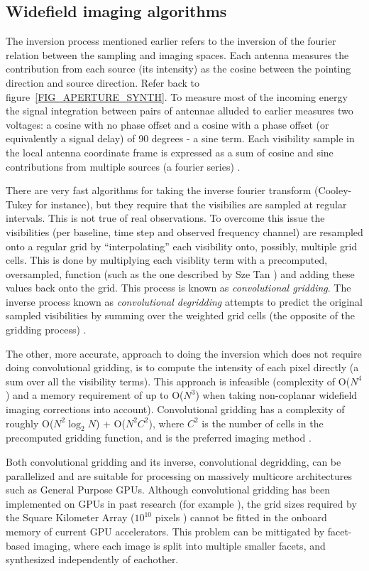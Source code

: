 \documentclass[a4paper, two column]{article}
\begin{document}
\subsection{Widefield imaging algorithms}
The inversion process mentioned earlier refers to the inversion of the fourier relation between the sampling and imaging spaces. Each antenna measures the contribution from each source (its intensity) as the cosine 
between the pointing direction and source direction. Refer back to figure~\ref{FIG_APERTURE_SYNTH}. To measure most of the incoming energy the signal integration between pairs of antennae alluded to earlier measures two voltages: a cosine 
with no phase offset and a cosine with a phase offset (or equivalently a signal delay) of 90 degrees - a sine term. Each visibility sample in the local antenna coordinate frame is expressed as a sum of cosine and sine 
contributions from multiple sources (a fourier series) \cite{taylor1999synthesis}.

There are very fast algorithms for taking the inverse fourier transform (Cooley-Tukey for instance), but they require that the visibilies are sampled at regular intervals. This is not true of real observations. 
To overcome this issue the visibilities (per baseline, time step and observed frequency channel) are resampled onto a regular grid by ``interpolating'' each visibility onto, possibly, multiple grid cells. This is done by 
multiplying each visiblity term with a precomputed, oversampled, function (such as the one described by Sze Tan \cite{tan1986aperture}) and adding these values back onto the grid. This process is known as \textit{convolutional gridding}. The inverse process known as 
\textit{convolutional degridding} attempts to predict the original sampled visibilities by summing over the weighted grid cells (the opposite of the gridding process) \cite{taylor1999synthesis}.

The other, more accurate, approach to doing the inversion which does not require doing convolutional gridding, is to compute the intensity of each pixel directly (a sum over all the visibility terms). This approach is infeasible
(complexity of O($N^4$) and a memory requirement of up to O($N^3$) when taking non-coplanar widefield imaging corrections into account). Convolutional gridding has a complexity 
of roughly O($N^2\log_2{N}$) + O($N^2C^2$), where $C^2$ is the number of cells in the precomputed gridding function, and is the preferred imaging method \cite[Lecture 7]{taylor1999synthesis}.

Both convolutional gridding and its inverse, convolutional degridding, can be parallelized and are suitable for processing on massively multicore architectures such as General Purpose GPUs. Although convolutional gridding 
has been implemented on GPUs in past research (for example \cite{romein2012efficient}), the grid sizes required by the Square Kilometer Array ($10^{10}$ pixels \cite{cornwell2012wide}) cannot be fitted in the onboard memory 
of current GPU accelerators. This problem can be mittigated by facet-based imaging, where each image is split into multiple smaller facets, and synthesized independently of eachother. 
\end{document}
